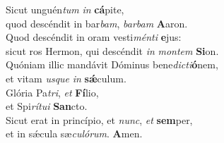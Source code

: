 \evenverse Sicut unguén\textit{tum} \textit{in} \textbf{cá}pite,~\*\\
\evenverse quod descéndit in bar\textit{bam}, \textit{bar}\textit{bam} \textbf{A}aron.\\
\oddverse Quod descéndit in oram vesti\textit{mén}\textit{ti} \textbf{e}jus:~\*\\
\oddverse sicut ros Hermon, qui descéndit \textit{in} \textit{mon}\textit{tem} \textbf{Si}on.\\
\evenverse Quóniam illic mandávit Dóminus bene\textit{di}\textit{cti}\textbf{ó}nem,~\*\\
\evenverse et vitam \textit{us}\textit{que} \textit{in} \textbf{sǽ}culum.\\
\oddverse Glória Pa\textit{tri}, \textit{et} \textbf{Fí}lio,~\*\\
\oddverse et Spi\textit{rí}\textit{tu}\textit{i} \textbf{San}cto.\\
\evenverse Sicut erat in princípio, et \textit{nunc}, \textit{et} \textbf{sem}per,~\*\\
\evenverse et in sǽcula sæ\textit{cu}\textit{ló}\textit{rum}. \textbf{A}men.\\
